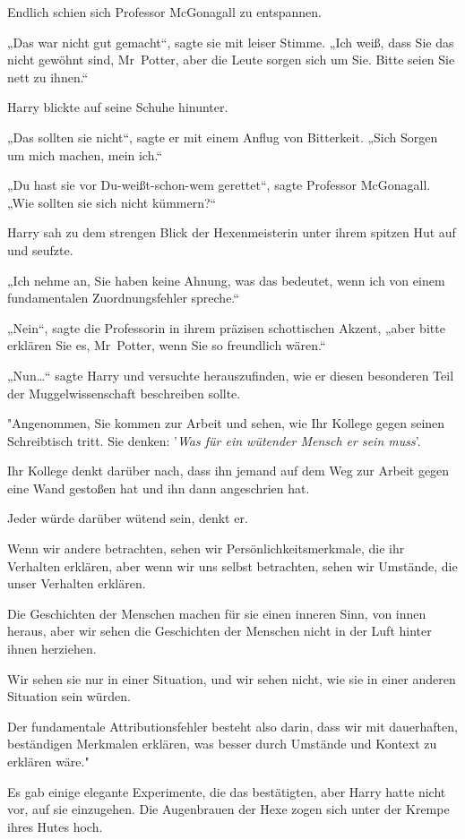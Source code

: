 {Endlich schien sich Professor McGonagall zu entspannen.

„Das war nicht gut gemacht“, sagte sie mit leiser Stimme. „Ich weiß, dass Sie das nicht gewöhnt sind, Mr~Potter, aber die Leute sorgen sich um Sie. Bitte seien Sie nett zu ihnen.“

Harry blickte auf seine Schuhe hinunter.

„Das sollten sie nicht“, sagte er mit einem Anflug von Bitterkeit. „Sich Sorgen um mich machen, mein ich.“

„Du hast sie vor Du-weißt-schon-wem gerettet“, sagte Professor McGonagall. „Wie sollten sie sich nicht kümmern?“

Harry sah zu dem strengen Blick der Hexenmeisterin unter ihrem spitzen Hut auf und seufzte.

„Ich nehme an, Sie haben keine Ahnung, was das bedeutet, wenn ich von einem fundamentalen Zuordnungsfehler spreche.“

„Nein“, sagte die Professorin in ihrem präzisen schottischen Akzent, „aber bitte erklären Sie es, Mr~Potter, wenn Sie so freundlich wären.“

„Nun…“ sagte Harry und versuchte herauszufinden, wie er diesen besonderen Teil der Muggelwissenschaft beschreiben sollte.

"Angenommen, Sie kommen zur Arbeit und sehen, wie Ihr Kollege gegen seinen Schreibtisch tritt. Sie denken: '\emph{Was für ein wütender Mensch er sein muss}'.

Ihr Kollege denkt darüber nach, dass ihn jemand auf dem Weg zur Arbeit gegen eine Wand gestoßen hat und ihn dann angeschrien hat.

Jeder würde darüber wütend sein, denkt er.

Wenn wir andere betrachten, sehen wir Persönlichkeitsmerkmale, die ihr Verhalten erklären, aber wenn wir uns selbst betrachten, sehen wir Umstände, die unser Verhalten erklären.

Die Geschichten der Menschen machen für sie einen inneren Sinn, von innen heraus, aber wir sehen die Geschichten der Menschen nicht in der Luft hinter ihnen herziehen.

Wir sehen sie nur in einer Situation, und wir sehen nicht, wie sie in einer anderen Situation sein würden.

Der fundamentale Attributionsfehler besteht also darin, dass wir mit dauerhaften, beständigen Merkmalen erklären, was besser durch Umstände und Kontext zu erklären wäre."

Es gab einige elegante Experimente, die das bestätigten, aber Harry hatte nicht vor, auf sie einzugehen. Die Augenbrauen der Hexe zogen sich unter der Krempe ihres Hutes hoch.

}
